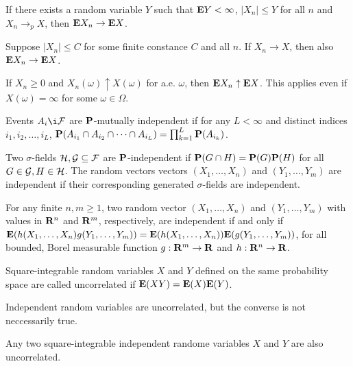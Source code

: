 \begin{theorem*}
If there exists a random variable $Y$ such that $\mathbf{E} Y < \infty$, $|X_n| \le Y$
for all $n$ and $X_n \rightarrow_p X$, then $\mathbf{E} X_n \rightarrow \mathbf{E} X$.
\end{theorem*} 

\begin{corollary*}
Suppose $|X_n| \le C$ for some finite constance $C$ and all $n$. If $X_n
\rightarrow X$, then also $\mathbf{E} X_n \rightarrow \mathbf{E} X$.
\end{corollary*} 

\begin{theorem*}
If $X_n \ge 0$ and $X_n(\omega)\uparrow X(\omega)$ for a.e. $\omega$, then
$\mathbf{E} X_n \uparrow \mathbf{E} X$. This applies even if $X(\omega) = \infty$ for some
$\omega \in \Omega$.
\end{theorem*} 

\begin{definition*} 
Events $A_i \i \F$ are $\mathbf{P}$-mutually independent if for any $L < \infty$ and
distinct indices $i_1, i_2, \dots, i_L$,
$\mathbf{P}(A_{i_1} \cap A_{i_2} \cap \dots \cap A_{i_L}) = \prod_{k=1}^L
\mathbf{P}(A_{i_k})$.
\end{definition*} 

\begin{definition*} 
Two $\sigma$-fields $\mathcal{H}, \mathcal{G} \subseteq \mathcal{F}$ are $\mathbf{P}$-independent if $\mathbf{P}(G \cap
H) = \mathbf{P}(G) \mathbf{P}(H)$ for all $G \in \mathcal{G}, H \in \mathcal{H}$. The random vectors vectors
$(X_1, \dots, X_n)$ and $(Y_1, \dots, Y_m)$ are independent if their
corresponding generated $\sigma$-fields are independent.
\end{definition*} 

\begin{proposition*} 
For any finite $n, m \ge 1$, two random vector $(X_1, \dots, X_n)$ and $(Y_1,
\dots, Y_m)$ with values in $\mathbf{R}^n$ and $\mathbf{R}^m$, respectively, are independent if
and only if $\mathbf{E}(h(X_1, \dots, X_n) g(Y_1, \dots, Y_m))
= \mathbf{E}(h(X_1, \dots, X_n)) \mathbf{E}(g(Y_1, \dots, Y_m))$, for all bounded, Borel
measurable function $g: \mathbf{R}^m \rightarrow \mathbf{R}$ and $h: \mathbf{R}^n \rightarrow \mathbf{R}$.
\end{proposition*} 

\begin{definition*} 
Square-integrable random variables $X$ and $Y$ defined on the same probability
space are called uncorrelated if $\mathbf{E}(XY) = \mathbf{E}(X) \mathbf{E}(Y)$.
\end{definition*} 

\begin{remark*} 
Independent random variables are uncorrelated, but the converse is not
neccessarily true.
\end{remark*} 

\begin{proposition*} 
Any two square-integrable independent randome variables $X$ and $Y$ are also
uncorrelated.
\end{proposition*} 







